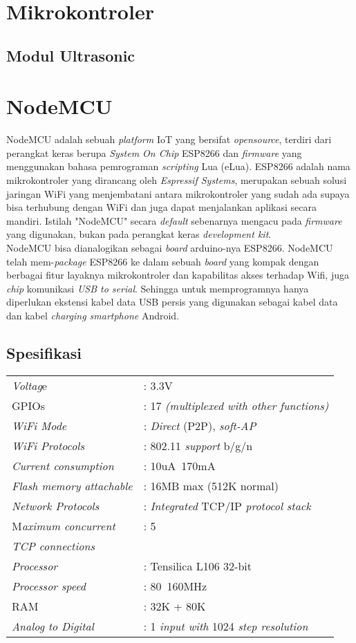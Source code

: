 \section{Mikrokontroler}
\subsection{Modul Ultrasonic}

\section{NodeMCU}
\tab NodeMCU adalah sebuah \textit{platform} IoT yang bersifat \textit{opensource}, terdiri dari perangkat keras berupa \textit{System On Chip} ESP8266 dan \textit{firmware} yang menggunakan bahasa pemrograman \textit{scripting} Lua (eLua). ESP8266 adalah nama mikrokontroler yang dirancang oleh \textit{Espressif Systems}, merupakan sebuah solusi jaringan WiFi yang menjembatani antara mikrokontroler yang sudah ada supaya bisa terhubung dengan WiFi dan juga dapat menjalankan aplikasi secara mandiri. Istilah "NodeMCU" secara \textit{default} sebenarnya mengacu pada \textit{firmware} yang digunakan, bukan pada perangkat keras \textit{development kit}.\\
\tab NodeMCU bisa dianalogikan sebagai \textit{board} arduino-nya ESP8266. NodeMCU telah mem-\textit{package} ESP8266 ke dalam sebuah \textit{board} yang kompak dengan berbagai fitur layaknya mikrokontroler dan kapabilitas akses terhadap Wifi, juga \textit{chip} komunikasi \textit{USB to serial}. Sehingga untuk memprogramnya hanya diperlukan ekstensi kabel data USB persis yang digunakan sebagai kabel data dan kabel \textit{charging smartphone} Android.

\subsection{Spesifikasi}
\begin{tabular}{ll}
	\tab \textit{Voltag}e &: 3.3V\\
	\tab GPIOs &: 17 \textit{(multiplexed with other functions)}\\
	\tab\textit{WiFi Mode} &: \textit{Direct} (P2P), \textit{soft-AP}\\
	\tab \textit{WiFi Protocols} &: 802.11 \textit{support} b/g/n\\
	\tab \textit{Current consumption} &: 10uA~170mA\\
	\tab \textit{Flash memory attachable} &: 16MB max (512K normal)\\
	\tab \textit{Network Protocols} &: \textit{Integrated} TCP/IP \textit{protocol stack}\\
	\tab M\textit{aximum concurrent}  &: 5\\
	\tab \textit{TCP connections}\\
	\tab \textit{Processor} &: Tensilica L106 32-bit\\
	\tab \textit{Processor speed }&: 80~160MHz\\
	\tab RAM &: 32K + 80K\\
	\tab \textit{Analog to Digital} &: 1 \textit{input with} 1024 \textit{step resolution}\\
\end{tabular}
	
